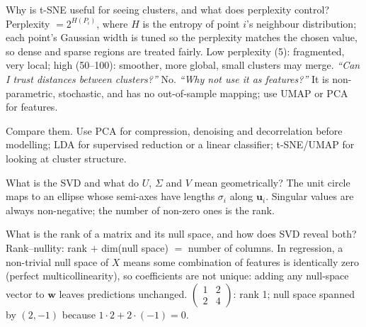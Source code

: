 \begin{qa}{ Why is t-SNE useful for seeing clusters, and what does perplexity control?}
\why Perplexity $= 2^{H(P_i)}$, where $H$ is the entropy of point $i$'s neighbour distribution; each point's Gaussian width is tuned so the perplexity
matches the chosen value, so dense and sparse regions are treated fairly. Low perplexity (5): fragmented, very local; high (50--100): smoother,
more global, small clusters may merge.
\pushes \emph{``Can I trust distances between clusters?''} No. \emph{``Why not use it as features?''} It is non-parametric, stochastic, and has no
out-of-sample mapping; use UMAP or PCA for features.
\end{qa}

\begin{qa}{ Compare them.}
\why Use PCA for compression, denoising and decorrelation before modelling; LDA for supervised reduction or a linear classifier; t-SNE/UMAP for
looking at cluster structure.
\end{qa}

\begin{qa}{What is the SVD and what do $U$, $\Sigma$ and $V$ mean geometrically?}
\why The unit circle maps to an ellipse whose semi-axes have lengths $\sigma_i$ along $\mathbf u_i$. Singular values are always non-negative; the
number of non-zero ones is the rank.
\end{qa}

\begin{qa}{ What is the rank of a matrix and its null space, and how does SVD reveal both?}
\why Rank--nullity: rank $+$ dim(null space) $=$ number of columns. In regression, a non-trivial null space of $X$ means some combination of features
is identically zero (perfect multicollinearity), so coefficients are not unique: adding any null-space vector to $\mathbf w$ leaves predictions unchanged.
\worked $\begin{pmatrix}1 & 2\\2 & 4\end{pmatrix}$: rank 1; null space spanned by $(2, -1)$ because $1\cdot2 + 2\cdot(-1) = 0$.
\end{qa}

